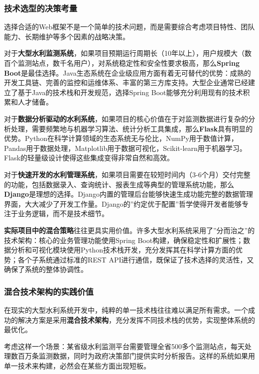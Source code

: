 \subsubsection{技术选型的决策考量}\label{ux6280ux672fux9009ux578bux7684ux51b3ux7b56ux8003ux91cf}

选择合适的Web框架不是一个简单的技术问题，而是需要综合考虑项目特性、团队能力、长期维护等多个因素的战略决策。

对于\textbf{大型水利监测系统}，如果项目预期运行周期长（10年以上），用户规模大（数百个监测站点，数千名用户），对系统稳定性和安全性要求极高，那么\textbf{Spring Boot}是最佳选择。Java生态系统在企业级应用方面有着无可替代的优势：成熟的开发工具链、完善的监控和运维体系、丰富的第三方库支持。大型企业通常已经建立了基于Java的技术栈和开发规范，选择Spring Boot能够充分利用现有的技术积累和人才储备。

对于\textbf{数据分析驱动的水利系统}，如果项目的核心价值在于对监测数据进行复杂的分析处理，需要频繁地与机器学习算法、统计分析工具集成，那么\textbf{Flask}具有明显的优势。Python在科学计算领域的生态系统无与伦比，NumPy用于数值计算，Pandas用于数据处理，Matplotlib用于数据可视化，Scikit-learn用于机器学习。Flask的轻量级设计使得这些集成变得非常自然和高效。

对于\textbf{快速开发的水利管理系统}，如果项目需要在较短时间内（3-6个月）交付完整的功能，包括数据录入、查询统计、报表生成等典型的管理系统功能，那么\textbf{Django}是理想的选择。Django内置的管理后台能够快速生成功能完整的数据管理界面，大大减少了开发工作量。Django的''约定优于配置''哲学使得开发者能够专注于业务逻辑，而不是技术细节。

\textbf{实际项目中的混合策略}往往更具实用价值。许多大型水利系统采用了''分而治之''的技术架构：核心的业务管理功能使用Spring Boot构建，确保稳定性和扩展性；数据分析和可视化模块使用Python技术栈开发，充分发挥其在科学计算方面的优势；各个子系统通过标准的REST API进行通信，既保证了技术选择的灵活性，又确保了系统的整体协调性。

\subsubsection{混合技术架构的实践价值}\label{ux6df7ux5408ux6280ux672fux67b6ux6784ux7684ux5b9eux8df5ux4ef7ux503c}

在现实的大型水利系统开发中，纯粹的单一技术栈往往难以满足所有需求。一个成功的解决方案是采用\textbf{混合技术架构}，充分发挥不同技术栈的优势，实现整体系统的最优化。

考虑这样一个场景：某省级水利监测平台需要管理全省500多个监测站点，每天处理数百万条监测数据，同时为政府决策部门提供实时分析报告。这样的系统如果用单一技术来构建，必然会在某些方面出现短板。

